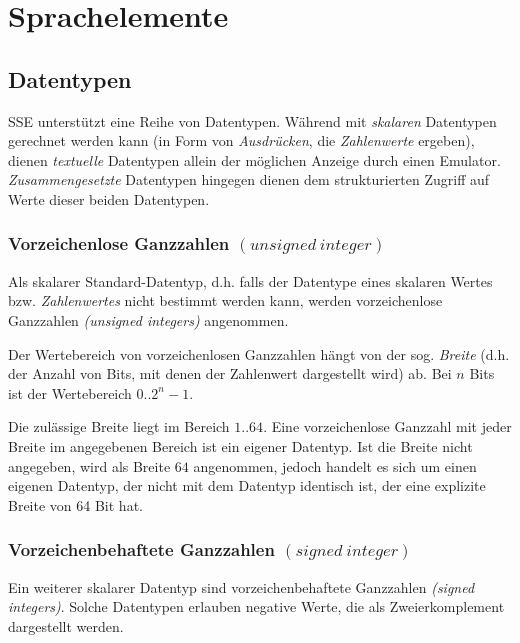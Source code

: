 \documentclass{scrartcl}
\begin{document}
\section{Sprachelemente}
\label{sec:language}

\subsection{Datentypen}

\noindent SSE unterstützt eine Reihe von Datentypen. Während mit \textit{skalaren} Datentypen gerechnet werden kann (in Form von \textit{Ausdrücken}, die \textit{Zahlenwerte} ergeben), dienen \textit{textuelle} Datentypen allein der möglichen Anzeige durch einen Emulator. \textit{Zusammengesetzte} Datentypen hingegen dienen dem strukturierten Zugriff auf Werte dieser beiden Datentypen.

\subsubsection{Vorzeichenlose Ganzzahlen $(unsigned~integer)$}

\noindent Als skalarer Standard-Datentyp, d.h. falls der Datentype eines skalaren Wertes bzw. \textit{Zahlenwertes} nicht bestimmt werden kann, werden vorzeichenlose Ganzzahlen \textit{(unsigned integers)} angenommen.

\vspace{10pt}
\noindent Der Wertebereich von vorzeichenlosen Ganzzahlen hängt von der sog. \textit{Breite} (d.h. der Anzahl von Bits, mit denen der Zahlenwert dargestellt wird) ab. Bei $n$ Bits ist der Wertebereich $0..2^{n} - 1$.

\vspace{10pt}
\noindent Die zulässige Breite liegt im Bereich $1..64$. Eine vorzeichenlose Ganzzahl mit jeder Breite im angegebenen Bereich ist ein eigener Datentyp. Ist die Breite nicht angegeben, wird als Breite $64$ angenommen, jedoch handelt es sich um einen eigenen Datentyp, der nicht mit dem Datentyp identisch ist, der eine explizite Breite von 64 Bit hat.

\subsubsection{Vorzeichenbehaftete Ganzzahlen $(signed~integer)$}

\noindent Ein weiterer skalarer Datentyp sind vorzeichenbehaftete Ganzzahlen \textit{(signed integers)}. Solche Datentypen erlauben negative Werte, die als Zweierkomplement dargestellt werden.
\end{document}
